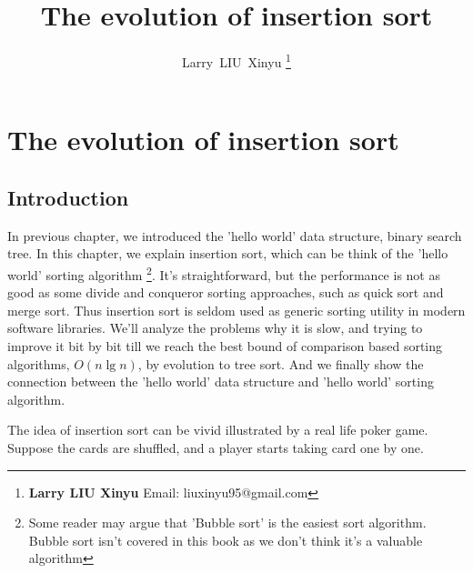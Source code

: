 \documentclass{article}
\begin{document}


\title{The evolution of insertion sort}

\author{Larry~LIU~Xinyu
\thanks{{\bfseries Larry LIU Xinyu } \newline
  Email: liuxinyu95@gmail.com \newline}
  }

\maketitle
\fi


\ifx\wholebook\relax
\chapter{The evolution of insertion sort}
\fi

\section{Introduction}
\label{introduction} 
In previous chapter, we introduced the 'hello world' data structure,
binary search tree. In this chapter, we explain insertion sort,
which can be think of the 'hello world' sorting algorithm
\footnote{Some reader may argue that 'Bubble sort' is the easiest
sort algorithm. Bubble sort isn't covered in this book as we don't
think it's a valuable algorithm\cite{wiki-bubble-sort}}.
It's straightforward, but the performance is not as good as some
divide and conqueror sorting approaches, such as quick sort
and merge sort. Thus insertion sort is seldom used as generic
sorting utility in modern software libraries. We'll analyze the
problems why it is slow, and trying to improve it bit by bit till
we reach the best bound of comparison based sorting algorithms, $O(n \lg n)$,
by evolution to tree sort. And we finally show the connection between
the 'hello world' data structure and 'hello world' sorting algorithm.

The idea of insertion sort can be vivid illustrated by a real life
poker game\cite{CLRS}. Suppose the cards are shuffled, and a player starts
taking card one by one.
\end{document}
